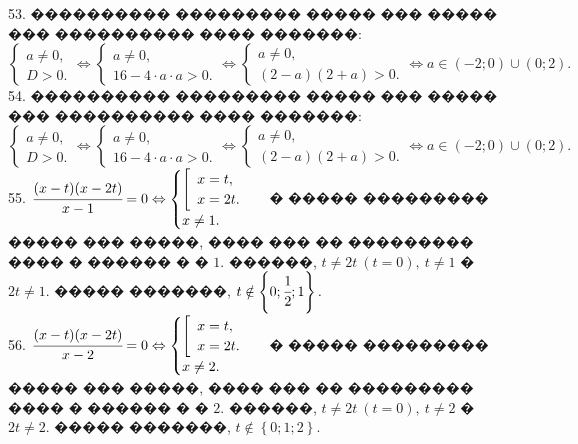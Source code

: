 \documentclass[12pt]{article}
\begin{document}
53. ���������� ��������� ����� ��� ����� ��� ���������� ���� �������:\\ $\begin{cases}a\neq0,\\ D>0.\end{cases}\Leftrightarrow
\begin{cases}a\neq0,\\ 16-4\cdot a \cdot a>0.\end{cases}\Leftrightarrow
\begin{cases}a\neq0,\\ (2-a)(2+a)>0.\end{cases}\Leftrightarrow a\in(-2;0)\cup(0;2).$\\
54. ���������� ��������� ����� ��� ����� ��� ���������� ���� �������:\\ $\begin{cases}a\neq0,\\ D>0.\end{cases}\Leftrightarrow
\begin{cases}a\neq0,\\ 16-4\cdot a \cdot a>0.\end{cases}\Leftrightarrow
\begin{cases}a\neq0,\\ (2-a)(2+a)>0.\end{cases}\Leftrightarrow a\in(-2;0)\cup(0;2).$\\
55. $\cfrac{(x-t)(x-2t)}{x-1}=0\Leftrightarrow\begin{cases}\left[\begin{array}{l}x=t,\\ x=2t.\end{array}\right.\\x\neq1.\end{cases}$
� ����� ��������� ����� ��� �����, ���� ��� �� ��������� ���� � ������ � � $1.$ ������, $t\neq2t\ (t=0),\ t\neq1$ � $2t\neq1.$ ����� �������, $t\notin\left\{0; \cfrac{1}{2}; 1\right\}.$\\
56. $\cfrac{(x-t)(x-2t)}{x-2}=0\Leftrightarrow\begin{cases}\left[\begin{array}{l}x=t,\\ x=2t.\end{array}\right.\\x\neq2.\end{cases}$
� ����� ��������� ����� ��� �����, ���� ��� �� ��������� ���� � ������ � � $2.$ ������, $t\neq2t\ (t=0),\ t\neq2$ � $2t\neq2.$ ����� �������, $t\notin\left\{0; 1; 2\right\}.$\\
\end{document}

